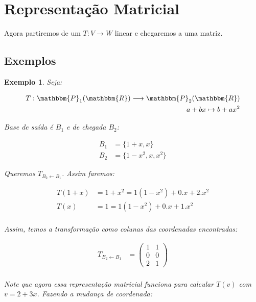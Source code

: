 \documentclass{article}
\newcommand{\REAL} {\mathbbm{R}}
\newcommand{\deffunc}[3] {#1: #2 \longrightarrow #3}
\newcommand{\mudabase}[3] {#1_{#2 \leftarrow #3}}
\newtheorem{example}{Exemplo}[section]
\begin{document}
    \section{Representação Matricial}
        Agora partiremos de um $\deffunc{T}{V}{W}$ linear e chegaremos a uma matriz.

        \subsection{Exemplos}
            \begin{example}
                Seja:
                
                \begin{align*}
                    \deffunc{T}{\mathbbm{P}_1(\REAL)}{\mathbbm{P}_2(\REAL)}\\
                    a + bx \mapsto b + ax^2\\
                \end{align*}

                Base de saída é $B_1$ e de chegada $B_2$:

                \begin{align*}
                    B_1 &= \{ 1 + x, x \}\\
                    B_2 &= \{ 1 - x^2, x, x^2 \}
                \end{align*}

                Queremos $\mudabase{T}{B_2}{B_1}$. Assim faremos:

                \begin{align*}
                    T(1 + x) &= 1 + x^2 = 1 (1 - x^2) + 0.x + 2.x^2\\
                    T(x) &= 1 = 1 (1 - x^2) + 0.x + 1.x^2\\
                \end{align*}

                Assim, temos a transformação como colunas das coordenadas encontradas:

                \begin{align*}
                    \mudabase{T}{B_2}{B_1} &= \begin{pmatrix}1&1\\0&0\\2&1\end{pmatrix}
                \end{align*}

                \paragraph{}
                Note que agora essa representação matricial funciona para calcular $T(v)$ com
                $v = 2 + 3x$. Fazendo a mudança de coordenada:


\end{example}
\end{document}
